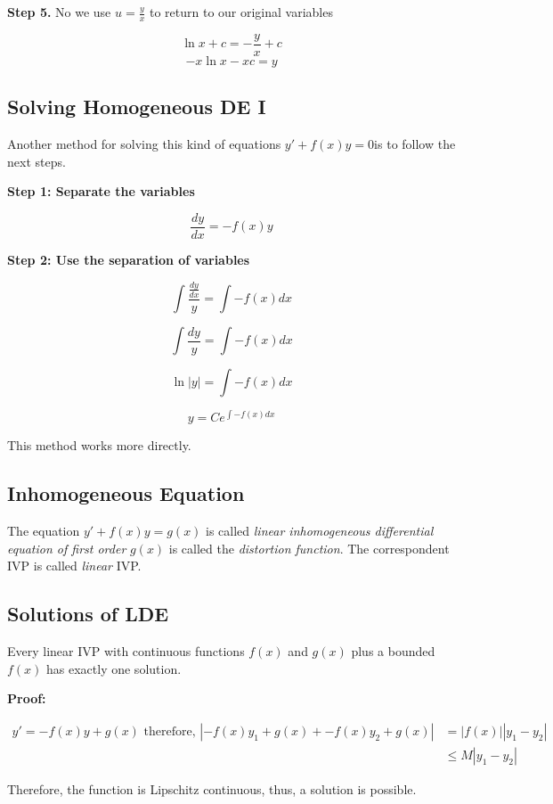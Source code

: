 \textbf{Step 5.} No we use \(u = \frac{y}{x}\) to return to our original variables

\[
    \ln x + c = -\frac{y}{x} + c
\]
\[
    -x\ln x - xc = y
\]

\subsection{Solving Homogeneous DE I}

Another method for solving this kind of equations \(y' + f(x)y = 0\)is to follow the next steps.

\textbf{Step 1: Separate the variables}

\[
    \frac{dy}{dx} = -f(x)y
\]

\textbf{Step 2: Use the separation of variables}

\[
    \int \frac{\frac{dy}{dx}}{y} = \int -f(x) dx
\]

\[
    \int \frac{dy}{y} = \int -f(x) dx
\]

\[
    \ln|y| = \int -f(x) dx
\]

\[
    y = C e^{\int -f(x) dx}
\]

This method works more directly.

\subsection{Inhomogeneous Equation}

The equation \(y' + f(x)y = g(x)\) is called \emph{linear inhomogeneous differential equation 
of first order} \(g(x)\) is called the \emph{distortion function}. The correspondent IVP is called
\emph{linear} IVP\@.

\subsection{Solutions of LDE}

Every linear IVP with continuous functions \(f(x)\) and \(g(x)\) plus a bounded \(f(x)\) 
has exactly one solution.

\textbf{Proof:}

\begin{align*}
    y' = -f(x)y + g(x) \text{ therefore, } |-f(x)y_1 + g(x) + -f(x)y_2 + g(x) | &= |f(x)||y_1 - y_2|\\
                                                                            &\le M |y_1 - y_2|
\end{align*}

Therefore, the function is Lipschitz continuous, thus, a solution is possible.
\QED

